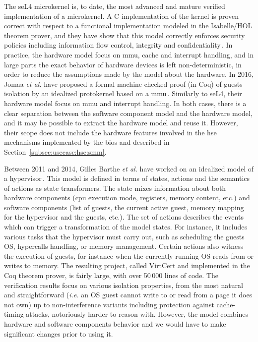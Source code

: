 The seL4 microkernel  is, to date, the most advanced and mature verified
implementation of a microkernel.
%
A C implementation of the kernel is proven correct with respect to a functional
implementation modeled in the Isabelle/HOL theorem prover, and they  have show
that this model correctly enforces security policies including information flow
control, integrity and confidentiality\,\cite{klein2009sel4}.
%
In practice, the hardware model focus on \ac{mmu}, cache and interrupt handling,
and in large parts the exact behavior of hardware devices is left
non-deterministic, in order to reduce the assumptions made by the model about
the hardware.
%
In 2016, Jomaa \emph{et al.} have proposed a formal machine-checked proof (in
Coq) of guests isolation by an idealized protokernel based on a
\ac{mmu}\,\cite{jomaa2016mmu}.
%
Similarly to seL4, their hardware model focus on \ac{mmu} and interrupt
handling.
%
In both cases, there is a clear separation between the software component model and
the hardware model, and it may be possible to extract the hardware model and
reuse it.
%
However, their scope does not include the hardware features involved in the
\ac{hse} mechanisms implemented by the \ac{bios} and described in
Section~\ref{subsec:usecase:hse:smm}.

Between 2011 and 2014, Gilles Barthe \emph{et al.} have worked on an idealized
model of a
hypervisor\,\cite{barthe2011virtcert1,barthe2012virtcert2,barthe2014virtcert3}.
%
This model is defined in terms of states, actions and the semantics of actions
as state trans\-formers.
%
The state mixes information about both hardware components (\ac{cpu} execution
mode, registers, memory content, etc.) and software components (list of guests,
the current active guest, memory mapping for the hypervisor and the guests,
etc.).
%
The set of actions describes the events which can trigger a transformation of
the model states.
%
For instance, it includes various tasks that the hypervisor must carry out, such
as scheduling the guests OS, hypercalls handling, or memory management.
%
Certain actions also witness the execution of guests, for instance when the
currently running OS reads from or writes to memory.
%
The resulting project, called VirtCert and implemented in the Coq theorem
prover, is fairly large, with over 50\,000 lines of code.
%
The verification results focus on various isolation properties, from the most
natural and straightforward (\emph{i.e.} an OS guest cannot write to or read
from a page it does not own) up to non-interference variants including
protection against cache-timing attacks, notoriously harder to reason with.
%
However, the model combines hardware and software components behavior and we
would have to make significant changes prior to using it.

